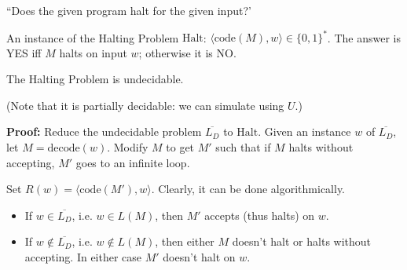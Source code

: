 \documentclass[handout]{beamer}
\begin{document}
\begin{frame}{``Does the given program halt for the given input?'}

    An instance of the \alert{Halting Problem} $\mathrm{Halt}$: $\langle \mathrm{code}(M),w\rangle\in \{0,1\}^*$. The answer is YES iff $M$ halts on input $w$; otherwise it is NO. 

    
    \begin{theorem}
        The Halting Problem is undecidable.
    \end{theorem}
    (Note that it is partially decidable: we can simulate using $U$.)

    \textbf{Proof:} Reduce the undecidable problem $\overline{L_D}$ to $\mathrm{Halt}$. Given an instance $w$ of $\overline{L_D}$, let $M=\mathrm{decode}(w)$. Modify $M$ to get $M'$ such that if $M$ \alert{halts without accepting}, $M'$ \alert{goes to an infinite loop}.

    Set \alert{$R(w)=\langle \mathrm{code}(M'),w\rangle$}. Clearly, it can be done algorithmically.

    \begin{itemize}
        \item If $w\in\overline{L_D}$, i.e. $w\in L(M)$, then $M'$ accepts (thus halts) on $w$.
        \item If $w\notin\overline{L_D}$, i.e. $w\notin L(M)$, then either $M$ doesn't halt or halts without accepting. In either case $M'$ doesn't halt on $w$. \hfill\qedsymbol
    \end{itemize}


\end{frame}
\end{document}
